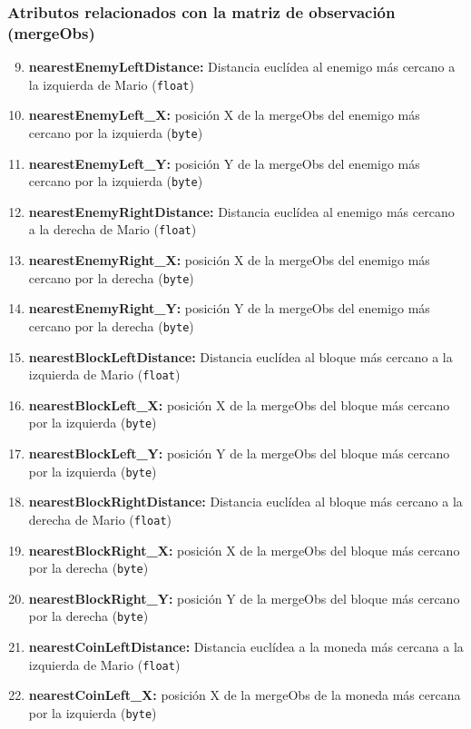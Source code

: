 \documentclass[10pt, spanish, pdftex]{../.template/template}
\begin{document}
    \subsubsection{Atributos relacionados con la matriz de observación (mergeObs)}
    \begin{enumerate}
        \setcounter{enumi}{8}
        \item \textbf{nearestEnemyLeftDistance:} Distancia euclídea al enemigo más cercano a la izquierda de Mario (\texttt{float})
        \item \textbf{nearestEnemyLeft\_X:} posición X de la mergeObs del enemigo más cercano por la izquierda (\texttt{byte})
        \item \textbf{nearestEnemyLeft\_Y:} posición Y de la mergeObs del enemigo más cercano por la izquierda (\texttt{byte})
        \item \textbf{nearestEnemyRightDistance:} Distancia euclídea al enemigo más cercano a la derecha de Mario (\texttt{float})
        \item \textbf{nearestEnemyRight\_X:} posición X de la mergeObs del enemigo más cercano por la derecha (\texttt{byte})
        \item \textbf{nearestEnemyRight\_Y:} posición Y de la mergeObs del enemigo más cercano por la derecha (\texttt{byte})
        \item \textbf{nearestBlockLeftDistance:} Distancia euclídea al bloque más cercano a la izquierda de Mario (\texttt{float})
        \item \textbf{nearestBlockLeft\_X:} posición X de la mergeObs del bloque más cercano por la izquierda (\texttt{byte})
        \item \textbf{nearestBlockLeft\_Y:} posición Y de la mergeObs del bloque más cercano por la izquierda (\texttt{byte})
        \item \textbf{nearestBlockRightDistance:} Distancia euclídea al bloque más cercano a la derecha de Mario (\texttt{float})
        \item \textbf{nearestBlockRight\_X:} posición X de la mergeObs del bloque más cercano por la derecha (\texttt{byte})
        \item \textbf{nearestBlockRight\_Y:} posición Y de la mergeObs del bloque más cercano por la derecha (\texttt{byte})
        \item \textbf{nearestCoinLeftDistance:} Distancia euclídea a la moneda más cercana a la izquierda de Mario (\texttt{float})
        \item \textbf{nearestCoinLeft\_X:} posición X de la mergeObs de la moneda más cercana por la izquierda (\texttt{byte})

\end{enumerate}
\end{document}
